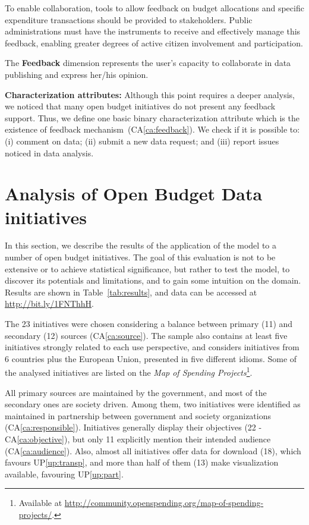 To enable collaboration, tools to allow feedback on budget allocations and specific expenditure transactions should be provided to stakeholders. 
Public administrations must have the instruments to receive and effectively manage this feedback, enabling greater degrees of active citizen involvement and participation.

		\begin{defn}The \textbf{Feedback} dimension represents the user's capacity to collaborate in data publishing and express her/his opinion.
		\end{defn}
		\noindent\textbf{Characterization attributes:}
Although this point requires a deeper analysis, we noticed that many open budget initiatives do not present any feedback support. 
Thus, we define one basic binary characterization attribute which is the existence of feedback mechanism~(CA\ref{ca:feedback}). 
We check if it is possible to: 
(i) comment on data;
(ii) submit a new data request; and 
(iii) report issues noticed in data analysis.


\section{Analysis of Open Budget Data initiatives}
\label{sec:analysis} 
In this section, we describe the results of the application of the model to a number of open budget initiatives. 
The goal of this evaluation is not to be extensive or to achieve statistical significance, but rather to test the model, to discover its potentials and limitations, and to gain some intuition on the domain.
Results are shown in Table~\ref{tab:results}, and data can be accessed at \url{http://bit.ly/1FNThhH}.

The 23 initiatives were chosen considering a balance between primary (11) and secondary (12) sources (CA\ref{ca:source}). 
The sample also contains at least five initiatives strongly related to each use perspective, and considers initiatives from 6 countries plus the European Union, presented in five different idioms. Some of the analysed initiatives are listed on the \emph{Map of Spending Projects}\footnote{Available at \url{http://community.openspending.org/map-of-spending-projects/}.}.

All primary sources are maintained by the government, and most of the secondary ones are society driven. 
Among them, two initiatives were identified as maintained in partnership between government and society organizations (CA\ref{ca:responsible}). 
Initiatives generally display their objectives (22 - CA\ref{ca:objective}), but only 11 explicitly mention their intended audience (CA\ref{ca:audience}). 
Also, almost all initiatives offer data for download (18), which favours UP\ref{up:transp}, and more than half of them (13) make visualization available, favouring UP\ref{up:part}.

